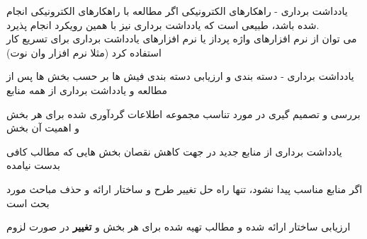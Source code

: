 \documentclass[14pt]{beamer}
\newcommand{\framefontsizelarge}{\fontsize{18pt}{0pt}\selectfont}
\newcommand{\frametitlefontsize}{\fontsize{20pt}{0pt}\selectfont}
\newcommand{\defaultvspace}{\vspace{5mm}}
\begin{document}
\begin{persian}
	\begin{frame}{\frametitlefontsize یادداشت برداری - راهکارهای الکترونیکی}
		\framefontsizelarge
		اگر مطالعه با راهکارهای الکترونیکی انجام شده باشد، طبیعی است که یادداشت برداری نیز با همین رویکرد انجام پذیرد. \defaultvspace\\
		می توان از نرم افزارهای واژه پرداز یا نرم افزارهای یادداشت برداری برای تسریع کار استفاده کرد (مثلا نرم افزار وان نوت)
	\end{frame}
	
	\begin{frame}{\frametitlefontsize  یادداشت برداری - دسته بندی و ارزیابی }
		\framefontsizelarge
		دسته بندی فیش ها بر حسب بخش ها پس از مطالعه و یادداشت برداری از همه منابع
		
		بررسی و تصمیم گیری در مورد تناسب مجموعه اطلاعات گردآوری شده برای هر بخش و اهمیت آن بخش

		یادداشت برداری از منابع جدید در جهت کاهش نقصان بخش هایی که مطالب کافی بدست نیامده
		
		اگر منابع مناسب پیدا نشود، تنها راه حل تغییر طرح و ساختار ارائه و حذف مباحث مورد بحث است
		
		ارزیابی ساختار ارائه شده و مطالب تهیه شده برای هر بخش و \textbf{تغییر} در صورت لزوم
	\end{frame}
	
\end{persian}
\end{document}
